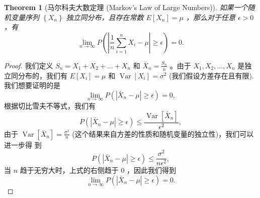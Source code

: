 \documentclass[UTF8,12pt]{ctexart}
\numberwithin{equation}{section}%
\newtheorem{thm}{Theorem}[section]
\begin{document}
	\begin{thm}[马尔科夫大数定理 (Markov's Law of Large Numbers)]
		如果一个随机变量序列 $\left\{X_n\right\}$ 独立同分布，且存在常数 $E\left[X_n\right]=\mu$ ，那么对于任意 $\epsilon>0$，有
		$$
		\lim _{n \rightarrow \infty} P\left(\left|\frac{1}{n} \sum_{i=1}^n X_i-\mu\right| \geq \epsilon\right)=0
		.$$
	\end{thm}
	
	\begin{proof}
		我们定义 $S_n=X_1+X_2+\ldots+X_n$ 和 $\bar{X}_n=\frac{S_n}{n}$ 。由于 $X_1, X_2, \ldots, X_n$ 是独立同分布的，我们有 $E\left[X_i\right]=\mu$ 和 $\operatorname{Var}\left[X_i\right]=\sigma^2$ (我们假设方差存在且有限).
		我们想要证明的是
		$$
		\lim _{n \rightarrow \infty} P\left(\left|\bar{X}_n-\mu\right| \geq \epsilon\right)=0,
		$$
		根据切比雪夫不等式，我们有
		$$
		P\left(\left|\bar{X}_n-\mu\right| \geq \epsilon\right) \leq \frac{\operatorname{Var}\left[\bar{X}_n\right]}{\epsilon^2},
		$$
		由于 $\operatorname{Var}\left[\bar{X}_n\right]=\frac{\sigma^2}{n}$ (这个结果来自方差的性质和随机变量的独立性)，我们可以进一步得 到
		$$
		P\left(\left|\bar{X}_n-\mu\right| \geq \epsilon\right) \leq \frac{\sigma^2}{n \epsilon^2},
		$$
		当 $n$ 趋于无穷大时，上式的右侧趋于 0 ，因此我们得到
		$$
		\lim _{n \rightarrow \infty} P\left(\left|\bar{X}_n-\mu\right| \geq \epsilon\right)=0.
		$$
	\end{proof}
	
\end{document}
